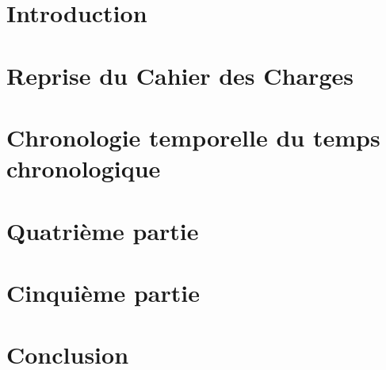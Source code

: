\documentclass[a4paper,12pt]{article}
\begin{document}
  

    

    \newpage

    \tableofcontents

    \newpage

    \section*{Introduction}
    \lipsum[1-2]


    \section{Reprise du Cahier des Charges}
    \lipsum[3-6]


    \section{Chronologie temporelle du temps chronologique}
    \lipsum[7-27]


    \section{Quatrième partie}



    \section{Cinquième partie}


    \section*{Conclusion}
\end{document}
